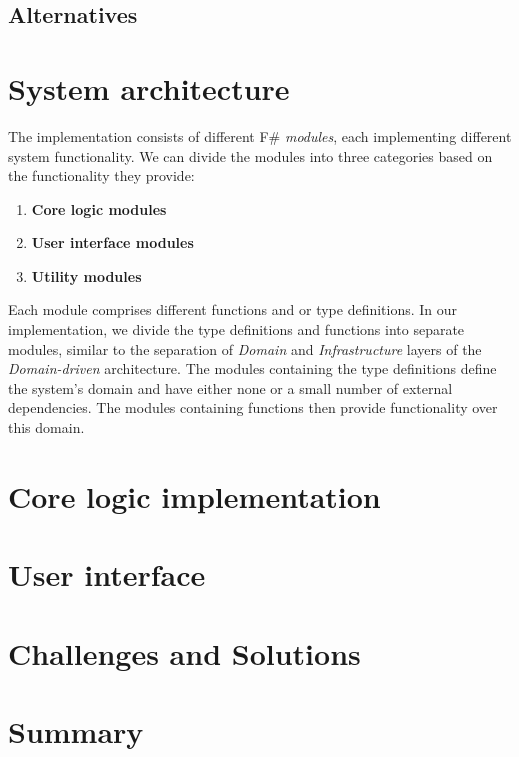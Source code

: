\subsection{Alternatives}

\section{System architecture}
\label{sec:appArch}
The implementation consists of different F\# \emph{modules}, each implementing different system functionality.
We can divide the modules into three categories based on the functionality they provide:
\begin{enumerate}
	\item \textbf{Core logic modules}
	\item \textbf{User interface modules}
	\item \textbf{Utility modules}
\end{enumerate}

Each module comprises different functions and or type definitions.
In our implementation, we divide the type definitions and functions into separate modules, similar to the separation of \emph{Domain} and \emph{Infrastructure} layers of the \emph{Domain-driven} architecture.
The modules containing the type definitions define the system's domain and have either none or a small number of external dependencies.
The modules containing functions then provide functionality over this domain.


\section{Core logic implementation}

\section{User interface}
\label{sec:ui}

\section{Challenges and Solutions}
\section{Summary}
